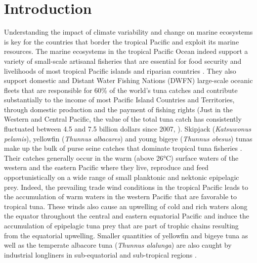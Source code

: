 
\section{Introduction}

Understanding the impact of climate variability and change on marine ecosystems is key for the countries that border the tropical Pacific and exploit its marine resources. The marine ecosystems in the tropical Pacific Ocean indeed support a variety of small-scale artisanal fisheries that are essential for food security and livelihoods of most tropical Pacific islands and riparian countries \citep{batistaTropicalArtisanalCoastal2014}. They also support domestic and Distant Water Fishing Nations (DWFN) large-scale oceanic fleets that are responsible for 60\% of the world's tuna catches and  contribute substantially to the income of most Pacific Island Countries and Territories, through domestic production and the payment of fishing rights (Just in the Western and Central Pacific, the value of the total tuna catch has consistently fluctuated between 4.5 and 7.5 billion dollars since 2007, \citealt{williamsOverviewTunaFisheries2021}). Skipjack (\textit{Katsuwonus pelamis}), yellowfin (\textit{Thunnus albacares}) and young bigeye (\textit{Thunnus obesus}) tunas make up the bulk of purse seine catches that dominate tropical tuna fisheries \citep{allainOverviewTunaFisheries2018}. Their catches generally occur in the warm (above 26°C) surface waters of the western and the eastern Pacific where they live, reproduce and feed opportunistically on a wide range of small planktonic and nektonic epipelagic prey. Indeed, the prevailing trade wind conditions in the tropical Pacific leads to the accumulation of warm waters in the western Pacific that are favorable to tropical tuna. These winds also cause an upwelling of cold and rich waters along the equator throughout the central and eastern equatorial Pacific and induce the accumulation of epipelagic tuna prey that are part of trophic chains resulting from the equatorial upwelling. Smaller quantities of yellowfin and bigeye tuna as well as the temperate albacore tuna (\textit{Thunnus alalunga}) are also caught by industrial longliners in sub-equatorial and sub-tropical regions \citep{allainOverviewTunaFisheries2018}.

